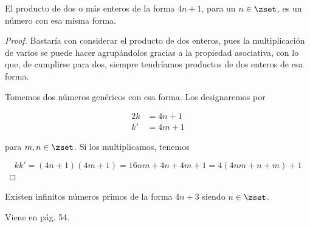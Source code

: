 \begin{lemma}
  El producto de dos o más enteros de la forma $4n + 1$, para un $n \in
  \zset$, es un número con esa misma forma.
\end{lemma}

\begin{proof}
  Bastaría con considerar el producto de dos enteros, pues la multiplicación
  de varios se puede hacer agrupándolos gracias a la propiedad asociativa,
  con lo que, de cumplirse para dos, siempre tendríamos productos de dos
  enteros de esa forma.

  Tomemos dos números genéricos con esa forma. Los designaremos por

  \begin{alignat*}{2}
    k &= 4n + 1 \\
    k' &= 4m + 1
  \end{alignat*}

  \noindent para $m, n \in \zset$. Si los multiplicamos, tenemos

  $$ kk' = (4n + 1)(4m + 1) = 16nm + 4n + 4m + 1 = 4(4nm + n + m) + 1 $$
\end{proof}

\begin{theorem}
  Existen infinitos números primos de la forma $4n + 3$ siendo $n \in
  \zset$.
\end{theorem}

Viene en \cite{burton} pág. 54.

